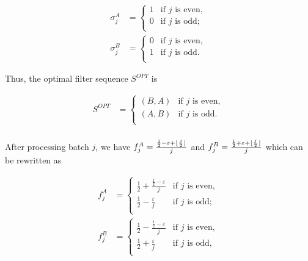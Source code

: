 \begin{align*}
\sigma_j^A &= 
    \begin{cases}
    1 & \text{if $j$ is even}, \\[0.5em]
    0 & \text{if $j$ is odd}; \\
    \end{cases}\\[0.5em]
\sigma_j^B &= 
    \begin{cases}
    0 & \text{if $j$ is even}, \\[0.5em]
    1 &  \text{if $j$ is odd}. \\
    \end{cases}
\end{align*}

Thus, the optimal filter sequence $S^{OPT}$ is 

\begin{align*}
S^{OPT} &= 
    \begin{cases}
    (B, A) & \text{if $j$ is even}, \\[0.5em]
    (A, B) & \text{if $j$ is odd}. \\
    \end{cases}\\[0.5em]
\end{align*}

\DeclarePairedDelimiter\floor{\lfloor}{\rfloor}
After processing batch $j$,  we have $f_j^A = \frac{\frac{1}{2} - \varepsilon + \floor{\frac{j}{2}}}{j}$ and $f_j^B = \frac{\frac{1}{2} + \varepsilon + \floor{\frac{j}{2}}}{j}$  which can be rewritten as

\begin{align*}
f_j^A &= 
    \begin{cases}
    \frac{1}{2} + \frac{\frac{1}{2}-\varepsilon}{j} & \text{if $j$ is even}, \\[0.5em]
    \frac{1}{2} - \frac{\varepsilon}{j} &  \text{if $j$ is odd}; \\
    \end{cases}\\[0.5em]
f_j^B &= 
    \begin{cases}
    \frac{1}{2} - \frac{\frac{1}{2}-\varepsilon}{j} & \text{if $j$ is even}, \\[0.5em]
    \frac{1}{2} + \frac{\varepsilon}{j} &  \text{if $j$ is odd}, \\
    \end{cases}\\[0.5em]
\end{align*}

